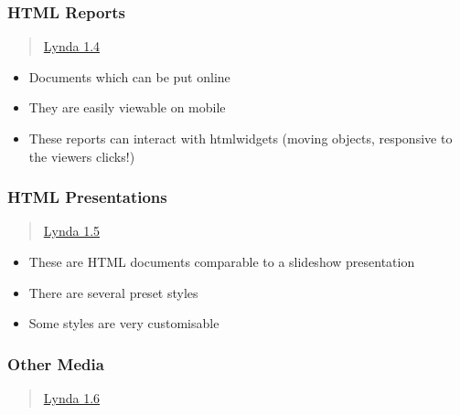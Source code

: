 \documentclass[]{article}
\providecommand{\tightlist}{%
  \setlength{\itemsep}{0pt}\setlength{\parskip}{0pt}}
\begin{document}
\hypertarget{html-reports}{%
\subsubsection{HTML Reports}\label{html-reports}}

\begin{quote}
\href{https://www.lynda.com/RStudio-tutorials/Writing-HTML-reports-R-Markdown/699348/2801126-4.html?srchtrk=index\%3a1\%0alinktypeid\%3a2\%0aq\%3ar+markdown\%0apage\%3a1\%0as\%3arelevance\%0asa\%3atrue\%0aproducttypeid\%3a2}{Lynda
1.4}
\end{quote}

\begin{itemize}
\tightlist
\item
  Documents which can be put online
\item
  They are easily viewable on mobile
\item
  These reports can interact with htmlwidgets (moving objects,
  responsive to the viewers clicks!)
\end{itemize}

\hypertarget{html-presentations}{%
\subsubsection{HTML Presentations}\label{html-presentations}}

\begin{quote}
\href{https://www.lynda.com/RStudio-tutorials/Writing-HTML-presentations-R-Markdown/699348/2801127-4.html?srchtrk=index\%3a1\%0alinktypeid\%3a2\%0aq\%3ar+markdown\%0apage\%3a1\%0as\%3arelevance\%0asa\%3atrue\%0aproducttypeid\%3a2}{Lynda
1.5}
\end{quote}

\begin{itemize}
\tightlist
\item
  These are HTML documents comparable to a slideshow presentation
\item
  There are several preset styles
\item
  Some styles are very customisable
\end{itemize}

\hypertarget{other-media}{%
\subsubsection{Other Media}\label{other-media}}

\begin{quote}
\href{https://www.lynda.com/RStudio-tutorials/What-else-can-you-build-R-Markdown/699348/2800211-4.html?srchtrk=index\%3a1\%0alinktypeid\%3a2\%0aq\%3ar+markdown\%0apage\%3a1\%0as\%3arelevance\%0asa\%3atrue\%0aproducttypeid\%3a2}{Lynda
1.6}
\end{quote}
\end{document}
